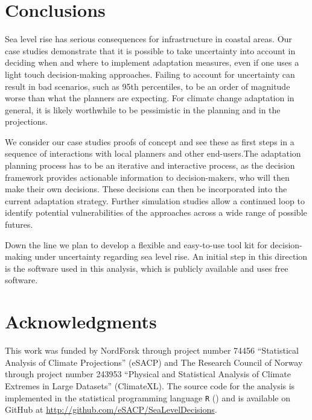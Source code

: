 \documentclass[note,screen,british,11pt]{nrdoc}
\begin{document}
\section{Conclusions}
\label{disc}
Sea level rise has serious consequences for infrastructure in coastal areas. Our case studies demonstrate that it is possible to take uncertainty into account in deciding when and where to implement adaptation measures, even if one uses a light touch decision-making approaches. Failing to account for uncertainty can result in bad scenarios, such as 95th percentiles, to be an order of magnitude worse than what the planners are expecting. For climate change adaptation in general, it is likely worthwhile to be pessimistic in the planning and in the projections. 

We consider our case studies proofs of concept and see these as first steps in a sequence of interactions with local planners and other end-users.The adaptation planning process has to be an iterative and interactive process, as the decision framework provides actionable information to decision-makers, who will then make their own decisions. These decisions can then be incorporated into the current adaptation strategy. Further simulation studies allow a continued loop to identify potential vulnerabilities of the approaches across a wide range of possible futures.

Down the line we plan to develop a flexible and easy-to-use tool kit for decision-making under uncertainty regarding sea level rise. An initial step in this direction is the software used in this analysis, which is publicly available and uses free software. 


\section*{Acknowledgments}
This work was funded by NordForsk through project number 74456 ``Statistical Analysis of Climate Projections'' (eSACP) and The Research Council of Norway through project number 243953 ``Physical and Statistical Analysis of Climate Extremes in Large Datasets'' (ClimateXL). The source code for the analysis is implemented in the statistical programming language {\tt R} (\citet{R}) and is available on GitHub at \url{http://github.com/eSACP/SeaLevelDecisions}.








\end{document}
